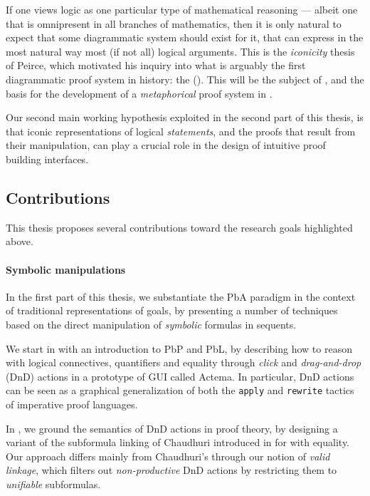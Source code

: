 If one views logic as one particular type of mathematical reasoning --- albeit
one that is omnipresent in all branches of mathematics, then it is only natural
to expect that some diagrammatic system should exist for it, that can express in
the most natural way most (if not all) logical arguments. This is the
\emph{iconicity} thesis of Peirce, which motivated his inquiry into what is
arguably the first diagrammatic proof system in history: the  (). This will be the subject of , and the basis
for the development of a \emph{metaphorical} proof system in .

\begin{emphpar}
  Our second main working hypothesis exploited in the second part of this
  thesis, is that iconic representations of logical \emph{statements}, and the
  proofs that result from their manipulation, can play a crucial role in the
  design of intuitive proof building interfaces.
\end{emphpar}

\subsection{Contributions}

This thesis proposes several contributions toward the research goals highlighted
above.

\paragraph{Symbolic manipulations}
  
In the first part of this thesis, we substantiate the PbA paradigm in the
context of traditional representations of goals, by presenting a number of
techniques based on the direct manipulation of \emph{symbolic} formulas in
sequents.

We start in  with an introduction to PbP and PbL, by describing how
to reason with logical connectives, quantifiers and equality through
\emph{click} and \emph{drag-and-drop} (DnD) actions in a prototype of GUI called
Actema. In particular, DnD actions can be seen as a graphical generalization of
both the \texttt{apply} and \texttt{rewrite} tactics of imperative proof
languages.

In , we ground the semantics of DnD actions in  proof
theory, by designing a variant of the subformula linking  of Chaudhuri
introduced in \cite{Chaudhuri2013} for   with equality. Our
approach differs mainly from Chaudhuri's through our notion of \emph{valid
linkage}, which filters out \emph{non-productive} DnD actions by restricting
them to \emph{unifiable} subformulas.

